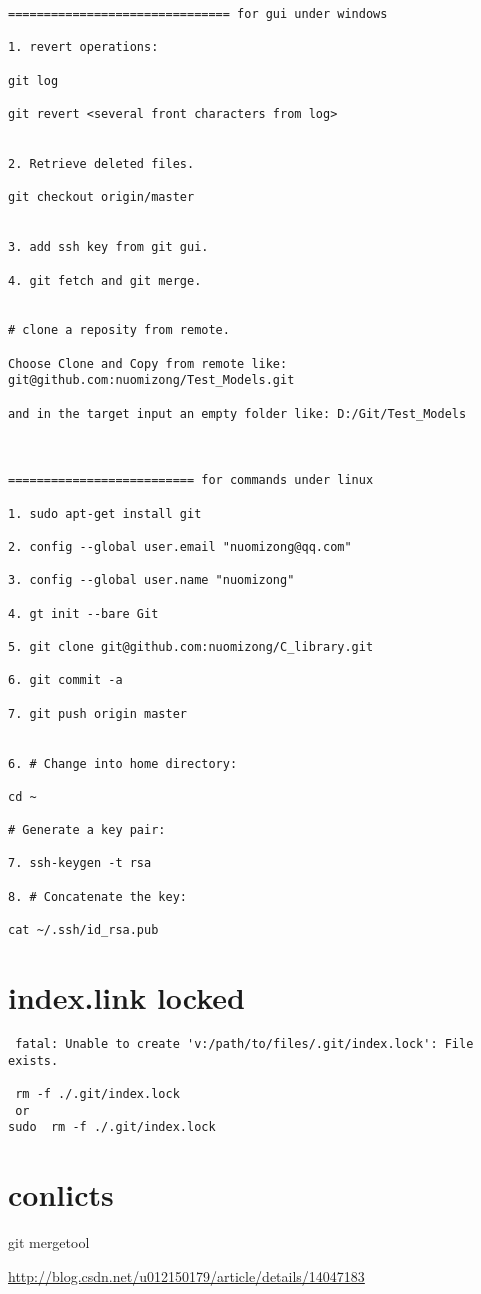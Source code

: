 \documentclass[10pt,a4paper]{article}
\begin{document}
\begin{lstlisting}
=============================== for gui under windows

1. revert operations:

git log

git revert <several front characters from log>


2. Retrieve deleted files.

git checkout origin/master


3. add ssh key from git gui.

4. git fetch and git merge.


# clone a reposity from remote.

Choose Clone and Copy from remote like: git@github.com:nuomizong/Test_Models.git

and in the target input an empty folder like: D:/Git/Test_Models



========================== for commands under linux

1. sudo apt-get install git

2. config --global user.email "nuomizong@qq.com"

3. config --global user.name "nuomizong"

4. gt init --bare Git

5. git clone git@github.com:nuomizong/C_library.git

6. git commit -a

7. git push origin master


6. # Change into home directory:

cd ~

# Generate a key pair:

7. ssh-keygen -t rsa

8. # Concatenate the key:

cat ~/.ssh/id_rsa.pub
\end{lstlisting}

\section{index.link locked}
\begin{lstlisting}
 fatal: Unable to create 'v:/path/to/files/.git/index.lock': File exists.
 
 rm -f ./.git/index.lock
 or
sudo  rm -f ./.git/index.lock
\end{lstlisting}

\section{conlicts}

git mergetool

\url{http://blog.csdn.net/u012150179/article/details/14047183}
\end{document}
